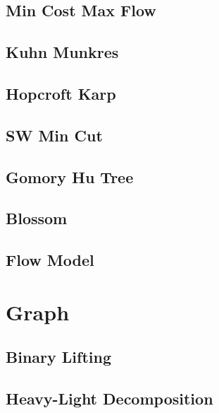 \subsection{Min Cost Max Flow}

\subsection{Kuhn Munkres}
\subsection{Hopcroft Karp}
\subsection{SW Min Cut}
\subsection{Gomory Hu Tree}
\subsection{Blossom}
\subsection{Flow Model}


\section{Graph}
\subsection{Binary Lifting}

\subsection{Heavy-Light Decomposition}

